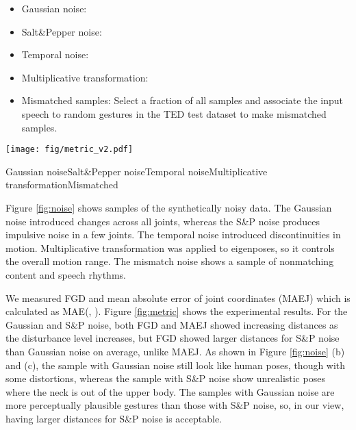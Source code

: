 \documentclass[acmtog]{acmart}
\begin{document}
\begin{itemize}
  \item Gaussian noise: 
  \item Salt\&Pepper noise: 
      
  \item Temporal noise:
      
  \item Multiplicative transformation: 
  \item Mismatched samples: Select a fraction  of all samples and associate the input speech to random gestures in the TED test dataset to make mismatched samples.
\end{itemize}

\begin{figure*}
  \centering
  \texttt{[image: fig/metric\_v2.pdf]}
  \begin{minipage}{\textwidth}
    \footnotesize
    \hspace{1.8cm}Gaussian noise\hspace{1.3cm}Salt\&Pepper noise\hspace{1.1cm}Temporal noise\hspace{1.3cm}Multiplicative transformation\hspace{1.5cm}Mismatched
  \end{minipage}
  \caption{Results of the metric validation experiment on the synthetic noisy dataset showing four types of noise. The disturbance level increases as  increases except for the multiplicative transformation. The disturbance level is lowest when  for the multiplicative transformation.}
  \label{fig:metric}
\end{figure*}

Figure \ref{fig:noise} shows samples of the synthetically noisy data. The Gaussian noise introduced changes across all joints, whereas the S\&P noise produces impulsive noise in a few joints. The temporal noise introduced discontinuities in motion. Multiplicative transformation was applied to eigenposes, so it controls the overall motion range. The mismatch noise shows a sample of nonmatching content and speech rhythms.

We measured FGD and mean absolute error of joint coordinates (MAEJ) which is calculated as MAE(, ). Figure \ref{fig:metric} shows the experimental results. For the Gaussian and S\&P noise, both FGD and MAEJ showed increasing distances as the disturbance level increases, but FGD showed larger distances for S\&P noise than Gaussian noise on average, unlike MAEJ. As shown in Figure \ref{fig:noise} (b) and (c), the sample with Gaussian noise still look like human poses, though with some distortions, whereas the sample with S\&P noise show unrealistic poses where the neck is out of the upper body. The samples with Gaussian noise are more perceptually plausible gestures than those with S\&P noise, so, in our view, having larger distances for S\&P noise is acceptable.
\end{document}
